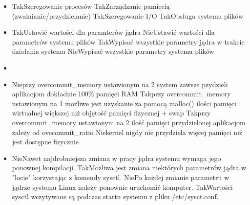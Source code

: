 \begin{itemize}
	
	\item {}
	{Tak}{Szeregowanie procesów}
	{Tak}{Zarządzanie pamięcią (zwalnianie/przydzielanie)}
	{Tak}{Szeregowanie I/O}
	{Tak}{Obsługa systemu plików}
	
	\item {}
	{Tak}{Ustawić wartości dla paramterów jądra}
	{Nie}{Ustawić wartości dla parametrów systemu plików}
	{Tak}{Wypisać wszystkie parametry jądra w trakcie działania systemu}
	{Nie}{Wypisać wszystkie parametry systemu plików}
	
	\newpage
	
		\item {}
	
	\item {}
	{Nie}{przy overcommit\_memory ustawionym na 2 system zawsze pzydzieli aplikacjom dokładnie 100\% pamięci RAM}
	{Tak}{przy overcommit\_memory ustawionym na 1 możliwe jest uzyskanie za pomocą malloc() ilości pamięci wirtualnej większej niż objętość pamięci fizycznej + swap}
	{Tak}{przy overcommit\_memory ustawionym na 2 ilość pamięci przydzielonej aplikacjom zależy od ovecommit\_ratio}
	{Nie}{kernel nigdy nie przydziela więcej pamięci niż jest dostępne fizycznie}
	
	\item {}
	{Nie}{Nawet najdrobniejsza zmiana w pracy jądra systemu wymaga jego ponownej kompilacji.}
	{Tak}{Możliwa jest zmiana niektórych parametrów jądra w "locie" korzystając z komendy sysctl.}
	{Nie}{Po każdej zmianie parametru w jądrze systemu Linux należy ponownie uruchomić komputer.}
	{Tak}{Wartości sysctl wczytywane są podczas startu systemu z pliku /etc/sysct.conf.}
	

\end{itemize}
